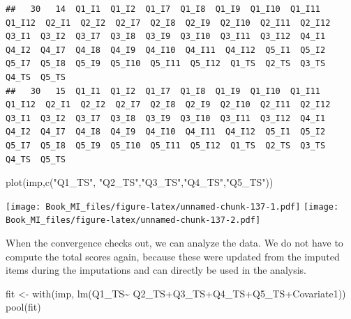 \documentclass[
]{book}
\newenvironment{Shaded}{\begin{snugshade}}{\end{snugshade}}
\newcommand{\FunctionTok}[1]{\textcolor[rgb]{0.00,0.00,0.00}{#1}}
\newcommand{\NormalTok}[1]{#1}
\newcommand{\OtherTok}[1]{\textcolor[rgb]{0.56,0.35,0.01}{#1}}
\newcommand{\SpecialCharTok}[1]{\textcolor[rgb]{0.00,0.00,0.00}{#1}}
\newcommand{\StringTok}[1]{\textcolor[rgb]{0.31,0.60,0.02}{#1}}
\begin{document}
\begin{verbatim}
##   30   14  Q1_I1  Q1_I2  Q1_I7  Q1_I8  Q1_I9  Q1_I10  Q1_I11  Q1_I12  Q2_I1  Q2_I2  Q2_I7  Q2_I8  Q2_I9  Q2_I10  Q2_I11  Q2_I12  Q3_I1  Q3_I2  Q3_I7  Q3_I8  Q3_I9  Q3_I10  Q3_I11  Q3_I12  Q4_I1  Q4_I2  Q4_I7  Q4_I8  Q4_I9  Q4_I10  Q4_I11  Q4_I12  Q5_I1  Q5_I2  Q5_I7  Q5_I8  Q5_I9  Q5_I10  Q5_I11  Q5_I12  Q1_TS  Q2_TS  Q3_TS  Q4_TS  Q5_TS
##   30   15  Q1_I1  Q1_I2  Q1_I7  Q1_I8  Q1_I9  Q1_I10  Q1_I11  Q1_I12  Q2_I1  Q2_I2  Q2_I7  Q2_I8  Q2_I9  Q2_I10  Q2_I11  Q2_I12  Q3_I1  Q3_I2  Q3_I7  Q3_I8  Q3_I9  Q3_I10  Q3_I11  Q3_I12  Q4_I1  Q4_I2  Q4_I7  Q4_I8  Q4_I9  Q4_I10  Q4_I11  Q4_I12  Q5_I1  Q5_I2  Q5_I7  Q5_I8  Q5_I9  Q5_I10  Q5_I11  Q5_I12  Q1_TS  Q2_TS  Q3_TS  Q4_TS  Q5_TS
\end{verbatim}

\begin{Shaded}
\begin{Highlighting}[]
\FunctionTok{plot}\NormalTok{(imp,}\FunctionTok{c}\NormalTok{(}\StringTok{"Q1\_TS"}\NormalTok{, }\StringTok{"Q2\_TS"}\NormalTok{,}\StringTok{"Q3\_TS"}\NormalTok{,}\StringTok{"Q4\_TS"}\NormalTok{,}\StringTok{"Q5\_TS"}\NormalTok{))}
\end{Highlighting}
\end{Shaded}

\texttt{[image: Book\_MI\_files/figure-latex/unnamed-chunk-137-1.pdf]} \texttt{[image: Book\_MI\_files/figure-latex/unnamed-chunk-137-2.pdf]}

When the convergence checks out, we can analyze the data. We do not have to compute the total scores again, because these were updated from the imputed items during the imputations and can directly be used in the analysis.

\begin{Shaded}
\begin{Highlighting}[]
\NormalTok{fit }\OtherTok{\textless{}{-}} \FunctionTok{with}\NormalTok{(imp, }\FunctionTok{lm}\NormalTok{(Q1\_TS}\SpecialCharTok{\textasciitilde{}}\NormalTok{ Q2\_TS}\SpecialCharTok{+}\NormalTok{Q3\_TS}\SpecialCharTok{+}\NormalTok{Q4\_TS}\SpecialCharTok{+}\NormalTok{Q5\_TS}\SpecialCharTok{+}\NormalTok{Covariate1))}
\FunctionTok{pool}\NormalTok{(fit)}
\end{Highlighting}
\end{Shaded}
\end{document}
